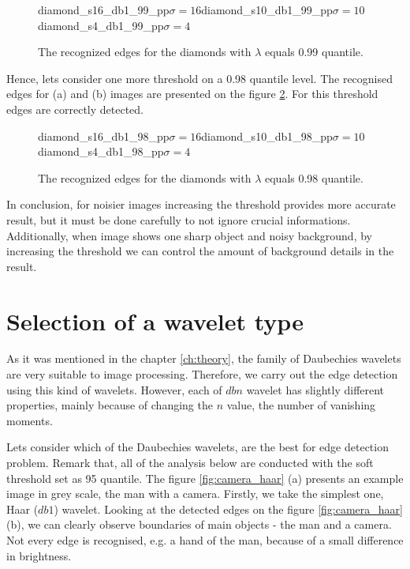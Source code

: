 \begin{figure}[h]
	\begin{subdiagrams3}{diamond_s16_db1_99_pp}{$\sigma=16$}{diamond_s10_db1_99_pp}{$\sigma=10$}{diamond_s4_db1_99_pp}{$\sigma=4$}
	\end{subdiagrams3}
	\centering
	\caption{The recognized edges for the diamonds with $\lambda$ equals 0.99 quantile.}
	\label{fig:diamonds_99}
\end{figure}

Hence, lets consider one more threshold on a 0.98 quantile level. The recognised edges for (a) and (b) images are presented on the figure \ref{fig:diamonds_98}. For this threshold edges are correctly detected.

\begin{figure}[h]
	\begin{subdiagrams3}{diamond_s16_db1_98_pp}{$\sigma=16$}{diamond_s10_db1_98_pp}{$\sigma=10$}{diamond_s4_db1_98_pp}{$\sigma=4$}
	\end{subdiagrams3}
	\centering
	\caption{The recognized edges for the diamonds with $\lambda$ equals 0.98 quantile.}
	\label{fig:diamonds_98}
\end{figure}


In conclusion, for noisier images increasing the threshold provides more accurate result, but it must be done carefully to not ignore crucial informations. Additionally, when image shows one sharp object and noisy background, by increasing the threshold we can control the amount of background details in the result.

\section{Selection of a wavelet type}

As it was mentioned in the chapter \ref{ch:theory}, the family of Daubechies wavelets are very suitable to image processing. Therefore, we carry out the edge detection using this kind of wavelets. However, each of $dbn$ wavelet has slightly different properties, mainly because of changing the $n$ value, the number of vanishing moments.

Lets consider which of the Daubechies wavelets, are the best for edge detection problem. Remark that, all of the analysis below are conducted with the soft threshold set as 95 quantile. The figure \ref{fig:camera_haar} (a) presents an example image in grey scale, the man with a camera.
Firstly, we take the simplest one, Haar ($db1$) wavelet. Looking at the detected edges on the figure \ref{fig:camera_haar} (b), we can clearly observe boundaries of main objects - the man and a camera. Not every edge is recognised, e.g. a hand of the man, because of a small difference in brightness.

